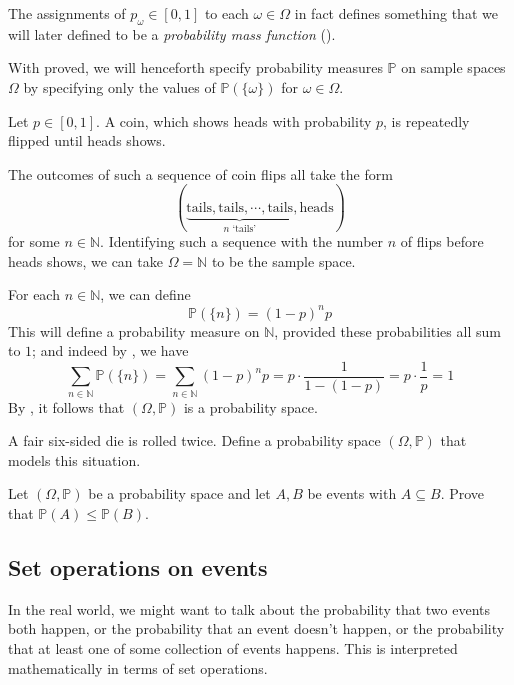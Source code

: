 The assignments of $p_{\omega} \in [0,1]$ to each $\omega \in \Omega$ in fact defines something that we will later defined to be a \textit{probability mass function} ().

With  proved, we will henceforth specify probability measures $\mathbb{P}$ on sample spaces $\Omega$ by specifying only the values of $\mathbb{P}(\{\omega\})$ for $\omega \in \Omega$.

\begin{example}
Let $p \in [0,1]$. A coin, which shows heads with probability $p$, is repeatedly flipped until heads shows.

The outcomes of such a sequence of coin flips all take the form
\[ (\underbrace{\text{tails}, \text{tails}, \cdots,\text{tails}}_{n \text{ `tails'}}, \text{heads}) \]
for some $n \in \mathbb{N}$. Identifying such a sequence with the number $n$ of flips before heads shows, we can take $\Omega = \mathbb{N}$ to be the sample space.

For each $n \in \mathbb{N}$, we can define
\[ \mathbb{P}(\{n\}) = (1-p)^np \]
This will define a probability measure on $\mathbb{N}$, provided these probabilities all sum to $1$; and indeed by , we have
\[ \sum_{n \in \mathbb{N}} \mathbb{P}(\{n\}) = \sum_{n \in \mathbb{N}} (1-p)^np = p \cdot \frac{1}{1-(1-p)} = p \cdot \frac{1}{p} = 1 \]
By , it follows that $(\Omega,\mathbb{P})$ is a probability space.
\end{example}

\begin{exercise}
A fair six-sided die is rolled twice. Define a probability space $(\Omega, \mathbb{P})$ that models this situation.
\end{exercise}

\begin{exercise}
\label{exProbabilityOfSubset}
Let $(\Omega,\mathbb{P})$ be a probability space and let $A,B$ be events with $A \subseteq B$. Prove that $\mathbb{P}(A) \le \mathbb{P}(B)$.
\end{exercise}

\subsection*{Set operations on events}

In the real world, we might want to talk about the probability that two events both happen, or the probability that an event doesn't happen, or the probability that at least one of some collection of events happens. This is interpreted mathematically in terms of set operations.

